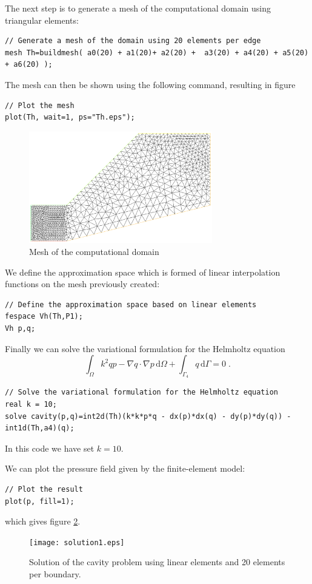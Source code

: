 \documentclass[english,3p]{elsarticle}
\newcommand{\dd}{\mathrm{d}}
\begin{document}
The next step is to generate a mesh of the computational domain using triangular elements:
\begin{lstlisting}
// Generate a mesh of the domain using 20 elements per edge
mesh Th=buildmesh( a0(20) + a1(20)+ a2(20) +  a3(20) + a4(20) + a5(20) + a6(20) );
\end{lstlisting}
The mesh can then be shown using the following command, resulting in figure
\begin{lstlisting}
// Plot the mesh
plot(Th, wait=1, ps="Th.eps");
\end{lstlisting}
\begin{figure}[h]
\centering
\includegraphics[width=80mm]{mesh.eps}
\caption{Mesh of the computational domain}
\label{fig:mesh}
\end{figure}

We define the approximation space which is formed of linear interpolation functions on the mesh previously created:
\begin{lstlisting}
// Define the approximation space based on linear elements
fespace Vh(Th,P1);
Vh p,q;
\end{lstlisting}

Finally we can solve the variational formulation for the Helmholtz equation
$$
\int_\Omega k^2qp - \nabla q\cdot\nabla p\,\dd\Omega+
\int_{\Gamma_4} q\,\dd\Gamma
=0
\;.
$$
\begin{lstlisting}
// Solve the variational formulation for the Helmholtz equation
real k = 10;
solve cavity(p,q)=int2d(Th)(k*k*p*q - dx(p)*dx(q) - dy(p)*dy(q)) - int1d(Th,a4)(q);
\end{lstlisting}
In this code we have set $k=10$.

We can plot the pressure field given by the finite-element model:
\begin{lstlisting}
// Plot the result
plot(p, fill=1);
\end{lstlisting}
which gives figure \ref{fig:solution1}.
\begin{figure}[h]
\centering
\texttt{[image: solution1.eps]}
\caption{Solution of the cavity problem using linear elements and 20 elements per boundary.}
\label{fig:solution1}
\end{figure}
\end{document}
